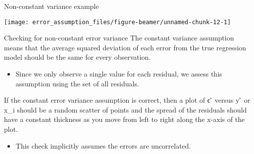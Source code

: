 \begin{frame}[fragile]{Non-constant variance example}
\protect\hypertarget{non-constant-variance-example}{}
\begin{Shaded}
\begin{Highlighting}[]
\StringTok{ }\NormalTok{(}\NormalTok{,}\NormalTok{, } \NormalTok{)}
\StringTok{ }\NormalTok{(}\NormalTok{, }\NormalTok{, } \NormalTok{)}
\StringTok{ }\OperatorTok{*}\OperatorTok{+}\StringTok{ }\OperatorTok{*}\OperatorTok{\^{}} \OperatorTok{{-}}\StringTok{ } \OperatorTok{+}\StringTok{ }\NormalTok{(}\NormalTok{, }\NormalTok{, }\NormalTok{)}
\NormalTok{(}\OperatorTok{\textasciitilde{}} \NormalTok{)}
\end{Highlighting}
\end{Shaded}

\begin{center}\texttt{[image: error\_assumption\_files/figure-beamer/unnamed-chunk-12-1]} \end{center}
\end{frame}

\begin{frame}{Checking for non-constant error variance}
\protect\hypertarget{checking-for-non-constant-error-variance}{}
The constant variance assumption means that the average squared
deviation of each error from the true regression model should be the
same for every observation.

\begin{itemize}
\tightlist
\item
  Since we only observe a single value for each residual, we assess this
  assumption using the set of all residuals.
\end{itemize}

If the constant error variance assumption is correct, then a plot of ϵ ̂
versus y ̂ or x\_i should be a random scatter of points and the spread
of the residuals should have a constant thickness as you move from left
to right along the x-axis of the plot.

\begin{itemize}
\tightlist
\item
  This check implicitly assumes the errors are uncorrelated.
\end{itemize}
\end{frame}

